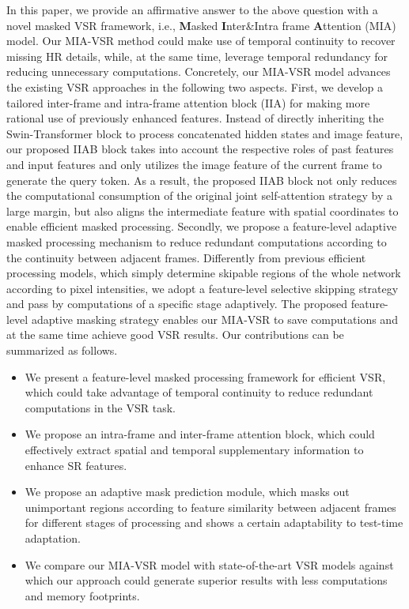 \documentclass[10pt,twocolumn,letterpaper]{article}
\begin{document}
In this paper, we provide an affirmative answer to the above question with a novel masked VSR framework, i.e., \textbf{M}asked \textbf{I}nter\&Intra frame \textbf{A}ttention (MIA) model.
Our MIA-VSR method could make use of temporal continuity to recover missing HR details, while, at the same time, leverage temporal redundancy for reducing unnecessary  computations.
%
Concretely, our MIA-VSR model advances the existing VSR approaches in the following two aspects.
%
First, we develop a tailored inter-frame and intra-frame attention block (IIA) for making more rational use of previously enhanced features.
%
Instead of directly inheriting the Swin-Transformer block \cite{liu2021swin} to process concatenated hidden states and image feature, our proposed IIAB block takes into account the respective roles of past features and input features and only utilizes the image feature of the current frame to generate the query token.
%
As a result, the proposed IIAB block not only reduces the computational consumption of the original joint self-attention strategy by a large margin, but also aligns the intermediate feature with spatial coordinates to enable efficient masked processing.
%
Secondly, we propose a feature-level adaptive masked processing mechanism
to reduce redundant computations according to the continuity between adjacent frames. 
%
Differently from previous efficient processing models, which simply determine skipable regions of the whole network according to pixel intensities, we adopt a feature-level selective skipping strategy and pass by computations of a specific stage adaptively.
%
The proposed feature-level adaptive masking strategy enables our MIA-VSR to save computations and at the same time achieve good VSR results.
%
Our contributions can be summarized as follows.

\begin{itemize}%
\item We present a feature-level masked processing framework for efficient VSR, which could take advantage of temporal continuity to reduce redundant computations in the VSR task.
\item We propose an intra-frame and inter-frame attention block, which could effectively extract spatial and temporal supplementary information to enhance SR features.
\item We propose an adaptive mask prediction module, which masks out unimportant regions according to feature similarity between adjacent frames for different stages of processing and shows a certain adaptability to test-time adaptation.
\item We compare our MIA-VSR model with state-of-the-art VSR models against which our approach could generate superior results with less computations and memory footprints.
\end{itemize}
\vspace{-0.2cm}
\end{document}
